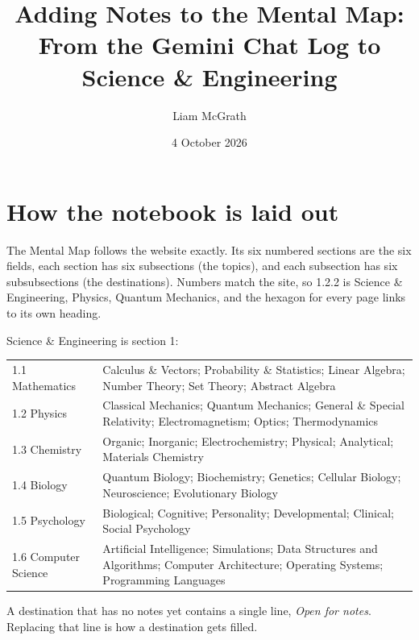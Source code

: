 \documentclass[11pt]{article}
\title{Adding Notes to the Mental Map: From the Gemini Chat Log to Science \& Engineering}
\author{Liam McGrath}
\date{4 October 2026}
\begin{document}
\maketitle
\tableofcontents

\section{How the notebook is laid out}
The Mental Map follows the website exactly. Its six numbered sections are the six fields, each section has six subsections (the topics), and each subsection has six subsubsections (the destinations). Numbers match the site, so 1.2.2 is Science \& Engineering, Physics, Quantum Mechanics, and the hexagon for every page links to its own heading.

Science \& Engineering is section 1:

\begin{center}
\begin{tabular}{lp{11.5cm}}
\hline
1.1 Mathematics & Calculus \& Vectors; Probability \& Statistics; Linear Algebra; Number Theory; Set Theory; Abstract Algebra \\
1.2 Physics & Classical Mechanics; Quantum Mechanics; General \& Special Relativity; Electromagnetism; Optics; Thermodynamics \\
1.3 Chemistry & Organic; Inorganic; Electrochemistry; Physical; Analytical; Materials Chemistry \\
1.4 Biology & Quantum Biology; Biochemistry; Genetics; Cellular Biology; Neuroscience; Evolutionary Biology \\
1.5 Psychology & Biological; Cognitive; Personality; Developmental; Clinical; Social Psychology \\
1.6 Computer Science & Artificial Intelligence; Simulations; Data Structures and Algorithms; Computer Architecture; Operating Systems; Programming Languages \\
\hline
\end{tabular}
\end{center}

A destination that has no notes yet contains a single line, \textit{Open for notes}. Replacing that line is how a destination gets filled.
\end{document}
